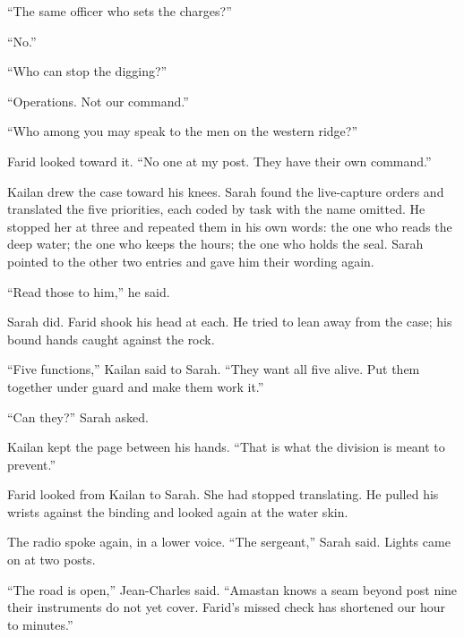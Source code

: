 ``The same officer who sets the charges?''\par

``No.''\par

``Who can stop the digging?''\par

``Operations. Not our command.''\par

``Who among you may speak to the men on the western ridge?''\par

Farid looked toward it. ``No one at my post. They have their own command.''\par

Kailan drew the case toward his knees. Sarah found the live-capture orders and translated the five priorities, each coded by task with the name omitted. He stopped her at three and repeated them in his own words: the one who reads the deep water; the one who keeps the hours; the one who holds the seal. Sarah pointed to the other two entries and gave him their wording again.\par

``Read those to him,'' he said.\par

Sarah did. Farid shook his head at each. He tried to lean away from the case; his bound hands caught against the rock.\par

``Five functions,'' Kailan said to Sarah. ``They want all five alive. Put them together under guard and make them work it.''\par

``Can they?'' Sarah asked.\par

Kailan kept the page between his hands. ``That is what the division is meant to prevent.''\par

Farid looked from Kailan to Sarah. She had stopped translating. He pulled his wrists against the binding and looked again at the water skin.\par

The radio spoke again, in a lower voice. ``The sergeant,'' Sarah said. Lights came on at two posts.\par

``The road is open,'' Jean-Charles said. ``Amastan knows a seam beyond post nine their instruments do not yet cover. Farid's missed check has shortened our hour to minutes.''\par

